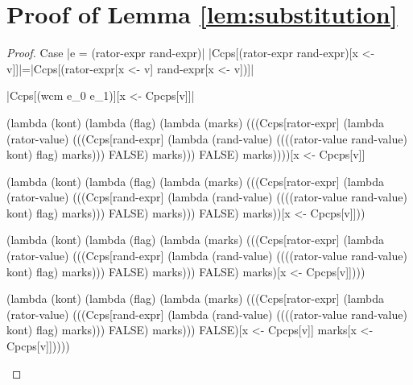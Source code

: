 \appendix
\chapter{Proof of Lemma \ref{lem:substitution}}

\begin{proof}{Case \scheme|e = (rator-expr rand-expr)|}
\scheme|Ccps[(rator-expr rand-expr)[x <- v]]|=\scheme|Ccps[(rator-expr[x <- v] rand-expr[x <- v])]|

\noindent
\scheme|Ccps[(wcm e_0 e_1)][x <- Cpcps[v]]|

\begin{schemeblock}
\begin{schemedisplay}
(lambda (kont)
   (lambda (flag)
     (lambda (marks)
       (((Ccps[rator-expr]
          (lambda (rator-value)
            (((Ccps[rand-expr]
               (lambda (rand-value)
                 ((((rator-value rand-value) kont) flag) marks)))
              FALSE) marks)))
         FALSE) marks))))[x <- Cpcps[v]]
\end{schemedisplay}
\end{schemeblock}

\begin{schemeblock}
\begin{schemedisplay}
(lambda (kont)
   (lambda (flag)
     (lambda (marks)
       (((Ccps[rator-expr]
          (lambda (rator-value)
            (((Ccps[rand-expr]
               (lambda (rand-value)
                 ((((rator-value rand-value) kont) flag) marks)))
              FALSE) marks)))
         FALSE) marks))[x <- Cpcps[v]]))
\end{schemedisplay}
\end{schemeblock}

\begin{schemeblock}
\begin{schemedisplay}
(lambda (kont)
   (lambda (flag)
     (lambda (marks)
       (((Ccps[rator-expr]
          (lambda (rator-value)
            (((Ccps[rand-expr]
               (lambda (rand-value)
                 ((((rator-value rand-value) kont) flag) marks)))
              FALSE) marks)))
         FALSE) marks)[x <- Cpcps[v]])))
\end{schemedisplay}
\end{schemeblock}

\begin{schemeblock}
\begin{schemedisplay}
(lambda (kont)
   (lambda (flag)
     (lambda (marks)
       (((Ccps[rator-expr]
          (lambda (rator-value)
            (((Ccps[rand-expr]
               (lambda (rand-value)
                 ((((rator-value rand-value) kont) flag) marks)))
              FALSE) marks)))
         FALSE)[x <- Cpcps[v]] marks[x <- Cpcps[v]]))))
\end{schemedisplay}
\end{schemeblock}


\end{proof}
